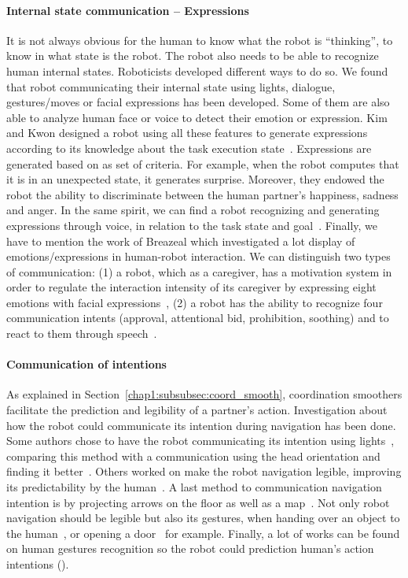 \documentclass[a4paper,11pt,twoside]{StyleThese}
\begin{document}
\paragraph{Internal state communication -- Expressions}
It is not always obvious for the human to know what the robot is ``thinking'', \ie to know in what state is the robot. The robot also needs to be able to recognize human internal states. Roboticists developed different ways to do so. We found that robot communicating their internal state using lights, dialogue, gestures/moves or facial expressions has been developed. Some of them are also able to analyze human face or voice to detect their emotion or expression. Kim and Kwon designed a robot using all these features to generate expressions according to its knowledge about the task execution state~\cite{kim_2010_computational}. Expressions are generated based on as set of criteria. For example, when the robot computes that it is in an unexpected state, it generates surprise. Moreover, they endowed the robot the ability to discriminate between the human partner's happiness, sadness and anger. In the same spirit, we can find a robot recognizing and generating expressions through voice, in relation to the task state and goal~\cite{scheutz_2006_utility}. Finally, we have to mention the work of Breazeal which investigated a lot display of emotions/expressions in human-robot interaction. We can distinguish two types of communication: (1) a robot, which as a caregiver, has a motivation system in order to regulate the interaction intensity of its caregiver by expressing eight emotions with facial expressions~\cite{breazeal_1998_motivational, breazeal_2004_function}, (2) a robot has the ability to recognize four communication intents (approval, attentional bid, prohibition, soothing) and to react to them through speech~\cite{breazeal_2002_regulation, breazeal_2003_emotion}.

\paragraph{Communication of intentions} As explained in Section~\ref{chap1:subsubsec:coord_smooth}, coordination smoothers facilitate the prediction and legibility of a partner's action. Investigation about how the robot could communicate its intention during navigation has been done. Some authors chose to have the robot communicating its intention using lights~\cite{szafir_2015_communicating}, comparing this method with a communication using the head orientation and finding it better~\cite{may_2015_show}. Others worked on make the robot navigation legible, improving its predictability by the human~\cite{dragan_2013_legibility, alami_2006_toward}. A last method to communication navigation intention is by projecting arrows on the floor as well as a map~\cite{chadalavada_2015_mind, coovert_2014_spatial}.  Not only robot navigation should be legible but also its gestures, when handing over an object to the human~\cite{sisbot_2012_human}, or opening a door~\cite{takayama_2011_expressing} for example. Finally, a lot of works can be found on human gestures recognition so the robot could prediction human's action intentions (\eg\cite{barros_2017_dynamic, chang_2018_effects}).
\end{document}
